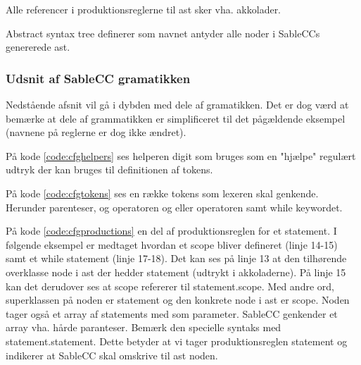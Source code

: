 Alle referencer i produktionsreglerne til \gls{ast} sker vha. akkolader. 

Abstract syntax tree definerer som navnet antyder alle noder i SableCCs genererede \gls{ast}.

\subsubsection*{Udsnit af SableCC gramatikken}
Nedstående afsnit vil gå i dybden med dele af gramatikken. Det er dog værd at bemærke at dele af grammatikken er simplificeret til det pågældende eksempel (navnene på reglerne er dog ikke ændret).





På kode \ref{code:cfghelpers} ses helperen digit som bruges som en "hjælpe" regulært udtryk der kan bruges til definitionen af tokens.


På kode \ref{code:cfgtokens} ses en række tokens som lexeren skal genkende. Herunder parenteser, og operatoren og eller operatoren samt while keywordet.


På kode \ref{code:cfgproductions} en del af produktionsreglen for et statement. I følgende eksempel er medtaget hvordan et scope bliver defineret (linje 14-15) samt et while statement (linje 17-18). Det kan ses på linje 13 at den tilhørende overklasse node i \gls{ast} der hedder statement (udtrykt i akkoladerne). På linje 15 kan det derudover ses at scope refererer til statement.scope. Med andre ord, superklassen på noden er statement og den konkrete node i \gls{ast} er scope. Noden tager også et array af statements med som parameter. SableCC genkender et array vha. hårde paranteser. Bemærk den specielle syntaks med statement.statement. Dette betyder at vi tager produktionsreglen statement og indikerer at SableCC skal omskrive til \gls{ast} noden.

